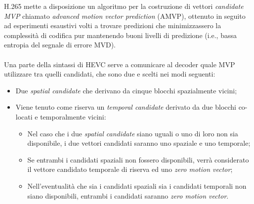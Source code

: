 H.265 mette a disposizione un algoritmo per la costruzione di vettori 
\emph{candidate MVP} chiamato \emph{advanced motion vector prediction} (AMVP), 
ottenuto in seguito ad esperimenti esaustivi volti a trovare predizioni che 
minimizzassero la complessità di codifica pur mantenendo buoni livelli di 
predizione (i.e., bassa entropia del segnale di errore MVD).
\\ \\
Una parte della sintassi di HEVC serve a comunicare al decoder quale MVP 
utilizzare tra quelli candidati, che sono due e scelti nei modi seguenti:
\begin{itemize}
\item Due \emph{spatial candidate} che derivano da cinque blocchi spazialmente 
vicini;
\item Viene tenuto come riserva un \emph{temporal candidate} derivato da due 
blocchi co-locati e temporalmente vicini:
\begin{itemize}
\item Nel caso che i due \emph{spatial candidate} siano uguali o uno di 
loro
 non sia disponibile, i due vettori candidati saranno uno spaziale e uno 
temporale;

\item Se entrambi i candidati spaziali non fossero disponibili, verrà 
considerato il vettore candidato temporale di riserva ed uno 
\emph{zero motion vector};

\item Nell'eventualità che sia i candidati spaziali sia i candidati temporali 
non siano disponibili, entrambi i candidati saranno \emph{zero motion vector}.
\end{itemize}
\end{itemize}

